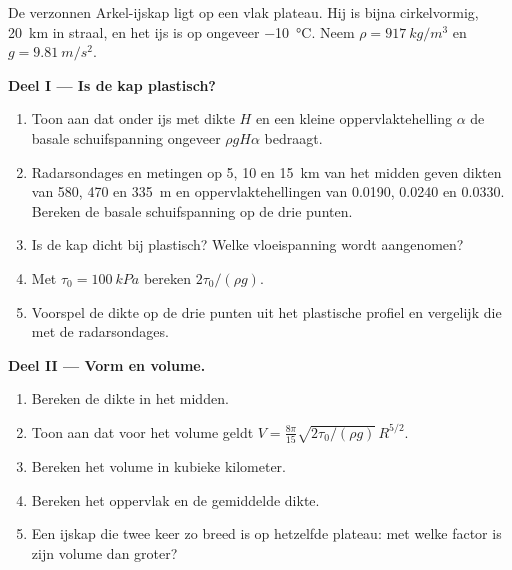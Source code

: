 \begin{problem}
\label{pb:b3:glaciology:1}
De verzonnen Arkel-ijskap ligt op een vlak plateau. Hij is bijna cirkelvormig,
\qty{20}{km} in straal, en het ijs is op ongeveer \qty{-10}{\celsius}. Neem
$\rho = \qty{917}{kg/m^3}$ en $g = \qty{9.81}{m/s^2}$.

\medskip\noindent\textbf{Deel I --- Is de kap plastisch?}
\begin{enumerate}
\item Toon aan dat onder ijs met dikte $H$ en een kleine oppervlaktehelling
  $\alpha$ de basale schuifspanning ongeveer $\rho gH\alpha$ bedraagt.
\item Radarsondages en metingen op 5, 10 en \qty{15}{km} van het midden
  geven dikten van 580, 470 en \qty{335}{m} en oppervlaktehellingen van
  \num{0.0190}, \num{0.0240} en \num{0.0330}. Bereken de basale
  schuifspanning op de drie punten.
\item Is de kap dicht bij plastisch? Welke vloeispanning wordt aangenomen?
\item Met $\tau_0 = \qty{100}{kPa}$ bereken $2\tau_0/(\rho g)$.
\item Voorspel de dikte op de drie punten uit het plastische profiel
  en vergelijk die met de radarsondages.
\end{enumerate}

\medskip\noindent\textbf{Deel II --- Vorm en volume.}
\begin{enumerate}[resume]
\item Bereken de dikte in het midden.
\item Toon aan dat voor het volume geldt $V = \frac{8\pi}{15}\sqrt{2\tau_0/(\rho
  g)}\,R^{5/2}$.
\item Bereken het volume in kubieke kilometer.
\item Bereken het oppervlak en de gemiddelde dikte.
\item Een ijskap die twee keer zo breed is op hetzelfde plateau: met welke factor is zijn
  volume dan groter?
\end{enumerate}


\end{problem}
